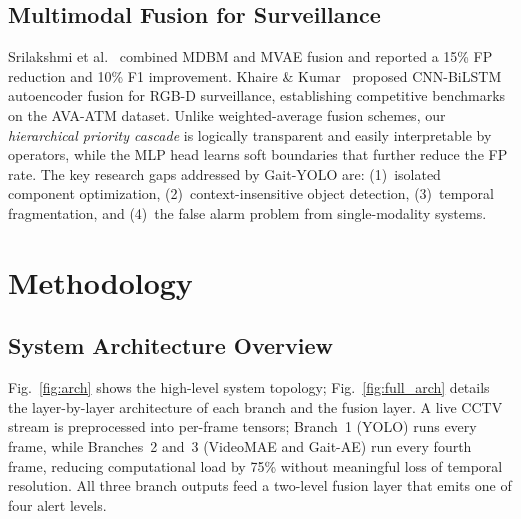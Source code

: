 \documentclass[conference]{IEEEtran}
\begin{document}
\subsection{Multimodal Fusion for Surveillance}
Srilakshmi et al.~\cite{srilakshmi2025} combined MDBM and MVAE fusion and
reported a 15\% FP reduction and 10\% F1 improvement.
Khaire \& Kumar~\cite{khaire2022} proposed CNN-BiLSTM autoencoder fusion
for RGB-D surveillance, establishing competitive benchmarks on the AVA-ATM
dataset.
Unlike weighted-average fusion schemes, our \emph{hierarchical priority
cascade} is logically transparent and easily interpretable by operators,
while the MLP head learns soft boundaries that further reduce the FP rate.
The key research gaps addressed by Gait-YOLO are: (1)~isolated component
optimization, (2)~context-insensitive object detection, (3)~temporal
fragmentation, and (4)~the false alarm problem from single-modality systems.

\section{Methodology}\label{sec:method}

\subsection{System Architecture Overview}

Fig.~\ref{fig:arch} shows the high-level system topology;
Fig.~\ref{fig:full_arch} details the layer-by-layer architecture of each branch
and the fusion layer.
A live CCTV stream is preprocessed into per-frame tensors; Branch~1 (YOLO)
runs every frame, while Branches~2 and~3 (VideoMAE and Gait-AE) run every
fourth frame, reducing computational load by 75\% without meaningful loss of
temporal resolution.
All three branch outputs feed a two-level fusion layer that emits one of
four alert levels.
\end{document}
